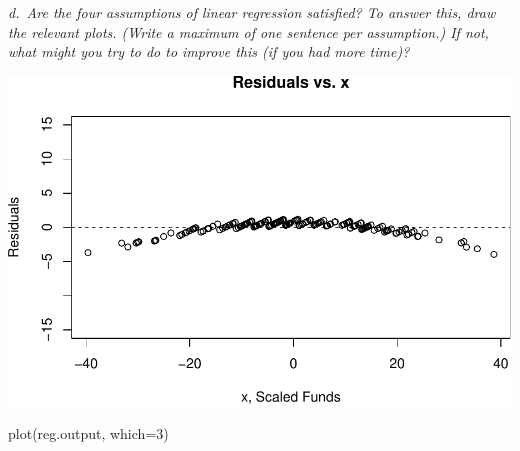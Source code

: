 \documentclass[
]{article}
\newenvironment{Shaded}{\begin{snugshade}}{\end{snugshade}}
\newcommand{\AttributeTok}[1]{\textcolor[rgb]{0.77,0.63,0.00}{#1}}
\newcommand{\ConstantTok}[1]{\textcolor[rgb]{0.00,0.00,0.00}{#1}}
\newcommand{\DecValTok}[1]{\textcolor[rgb]{0.00,0.00,0.81}{#1}}
\newcommand{\FunctionTok}[1]{\textcolor[rgb]{0.00,0.00,0.00}{#1}}
\newcommand{\NormalTok}[1]{#1}
\newcommand{\OtherTok}[1]{\textcolor[rgb]{0.56,0.35,0.01}{#1}}
\newcommand{\SpecialCharTok}[1]{\textcolor[rgb]{0.00,0.00,0.00}{#1}}
\newcommand{\StringTok}[1]{\textcolor[rgb]{0.31,0.60,0.02}{#1}}
\begin{document}
\emph{d.~Are the four assumptions of linear regression satisfied? To
answer this, draw the relevant plots. (Write a maximum of one sentence
per assumption.) If not, what might you try to do to improve this (if
you had more time)?}

\begin{Shaded}
\end{Shaded}

\includegraphics{Journal_files/figure-latex/unnamed-chunk-44-1.pdf}

\begin{Shaded}
\begin{Highlighting}[]
\FunctionTok{plot}\NormalTok{(reg.output, }\AttributeTok{which=}\DecValTok{3}\NormalTok{)}
\end{Highlighting}
\end{Shaded}
\end{document}
